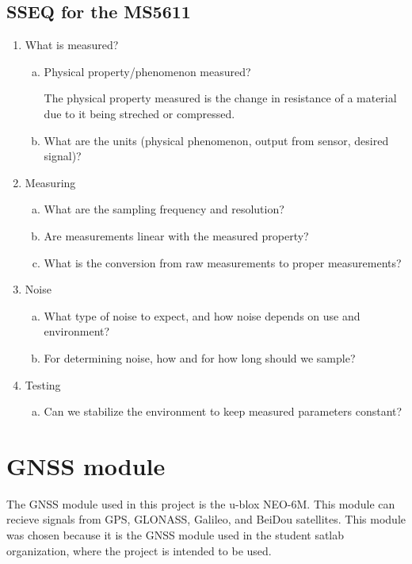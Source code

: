 \subsection{SSEQ for the MS5611}
\begin{enumerate}
    \item What is measured?
    \begin{enumerate}[(a)]
        \item Physical property/phenomenon measured?

        The physical property measured is the change in resistance of a material due to it being streched or compressed.



        \item What are the units (physical phenomenon, output from sensor, desired signal)?
    \end{enumerate}

    \item Measuring
    \begin{enumerate}[(a)]
        \item What are the sampling frequency and resolution?



        \item Are measurements linear with the measured property?




        \item What is the conversion from raw measurements to proper measurements?
    \end{enumerate}
    \item Noise
    \begin{enumerate}[(a)]
        \item What type of noise to expect, and how noise depends on use and environment?
        \item For determining noise, how and for how long should we sample?
    \end{enumerate}
    \item Testing
    \begin{enumerate}[(a)]
        \item Can we stabilize the environment to keep measured parameters constant?
    \end{enumerate}
\end{enumerate}


\section{GNSS module}\label{sec:gnss-module}
The GNSS module used in this project is the u-blox NEO-6M.
This module can recieve signals from GPS, GLONASS, Galileo, and BeiDou satellites.
This module was chosen because it is the GNSS module used in the student satlab organization, where the project is intended to be used.

